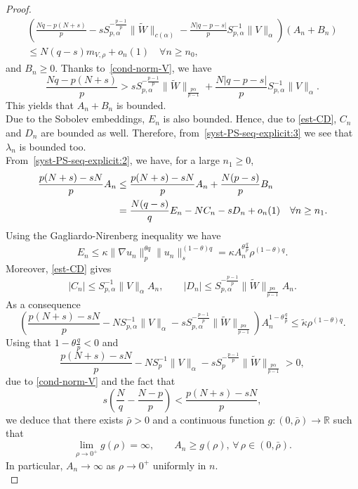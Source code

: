 \documentclass[10pt,a4paper]{amsart}
\newcommand{\R}{\mathbb{R}}
\begin{document}
\begin{proof}
\begin{align*}
    \left(\frac{Nq-p(N+s)}{p} -sS_{p,\alpha}^{-\frac{p-1}{p}}\|\tilde{W}\|_{c(\alpha)} 
    - \frac{N|q-p-s|}{p} S_{p,\alpha}^{-1}\|V\|_{\alpha} 
    \right)(A_n+B_n)\\
    \le 
      N(q-s)m_{V,\rho}+o_n(1)\quad\forall n\ge n_0,
\end{align*}
and $B_n\ge 0$.
Thanks to~\eqref{cond-norm-V}, we have
\[
\frac{Nq-p(N+s)}{p} > sS_{p,\alpha}^{-\frac{p-1}{p}}\|\tilde{W}\|_{\frac{p\alpha}{p-1}} 
    + \frac{N|q-p-s|}{p} S_{p,\alpha}^{-1}\|V\|_{\alpha}.
\]
This yields that $A_n+B_n$ is bounded.\\
Due to the Sobolev embeddings, $E_n$ is also bounded. Hence, due to \eqref{est-CD}, $C_n$ and $D_n$ are bounded as well. 
Therefore, from~\eqref{syst-PS-seq-explicit:3} we see that $\lambda_n$ is bounded too.\\

From~\eqref{syst-PS-seq-explicit:2}, we have, for a large $n_1\ge 0$,
\begin{equation}\notag
\begin{aligned}
\frac{p(N+s)-sN}{p}A_n
&\le\frac{p(N+s)-sN}{p}A_n+\frac{N(p-s)}{p}B_n\\
&=\frac{N(q-s)}{q}E_n-NC_n-sD_n+o_n(1)\quad\forall n\ge n_1.
\end{aligned}    
\end{equation}
Using the Gagliardo-Nirenberg inequality we have
$$E_n\le \kappa\|\nabla u_n\|_p^{\theta q}\|u_n\|_s^{(1-\theta)q}=\kappa A_n^{\theta\frac{q}{p}}\rho^{(1-\theta)q}.$$
Moreover, \eqref{est-CD} gives
$$|C_n|\le S_{p,\alpha}^{-1}\|V\|_{\alpha}A_n,\qquad |D_n|\le S_{p,\alpha}^{-\frac{p-1}{p}}\|\tilde{W}\|_{\frac{p\alpha}{p-1}}A_n.$$
As a consequence
$$\left(\frac{p(N+s)-sN}{p}-NS_{p,\alpha}^{-1}\|V\|_{\alpha}-sS_{p,\alpha}^{-\frac{p-1}{p}}\|\tilde{W}\|_{\frac{p\alpha}{p-1}}\right)A_n^{1-\theta\frac{q}{p}}
\le\tilde{\kappa}\rho^{(1-\theta)q}.$$
Using that $1-\theta\frac{q}{p}<0$ and
\begin{equation}
\label{extra-cond-V1}
\frac{p(N+s)-sN}{p}-N S_p^{-1}\|V\|_{\alpha}-s S_p^{-\frac{p-1}{p}}\|\tilde{W}\|_{\frac{p\alpha}{p-1}}>0,
\end{equation}
due to \eqref{cond-norm-V} and the fact that
$$s\left(\frac{N}{q}-\frac{N-p}{p}\right)<\frac{p(N+s)-sN}{p},$$
we deduce that there exists $\bar{\rho}>0$ and a continuous function $g:(0,\bar{\rho})\to\R$ such that 
\begin{equation}\label{A-n-bd-below}
\lim_{\rho\to 0^+}g(\rho)=\infty,\qquad A_n\ge g(\rho),\,\forall\,\rho\in(0,\bar{\rho}).
\end{equation}
In particular, $A_n\to\infty$ as $\rho\to 0^+$ uniformly in $n$.\\


\end{proof}
\end{document}
